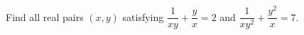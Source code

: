 Find all real pairs $(x,y)$ satisfying $\dfrac{1}{xy}+\dfrac{y}{x}=2$ and $\dfrac{1}{xy^2}+\dfrac{y^2}{x}=7$.

